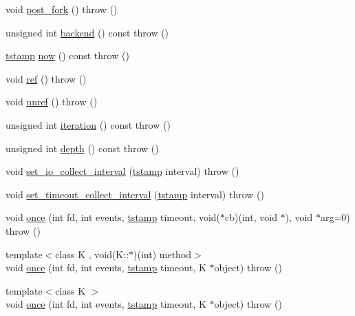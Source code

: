 \begin{DoxyCompactItemize}
\item 
void \hyperlink{structev_1_1loop__ref_a974a8c58270dc360e96f567d31a7176e}{post\-\_\-fork} ()  throw ()
\item 
unsigned int \hyperlink{structev_1_1loop__ref_ae47173b96e5b1a587c38070bfe78d98a}{backend} () const   throw ()
\item 
\hyperlink{namespaceev_a9853823b701944a8a5ce179d10a24b97}{tstamp} \hyperlink{structev_1_1loop__ref_a98d982e3931bfdd1e920dd577db61c31}{now} () const   throw ()
\item 
void \hyperlink{structev_1_1loop__ref_ae84429cc5d55e687f3abbd5c0bfe7430}{ref} ()  throw ()
\item 
void \hyperlink{structev_1_1loop__ref_abe058b11156f019666c15a53a3fa7218}{unref} ()  throw ()
\item 
unsigned int \hyperlink{structev_1_1loop__ref_a2b3d64162433abbd749e2722926fb0b5}{iteration} () const   throw ()
\item 
unsigned int \hyperlink{structev_1_1loop__ref_a38a6400670c0b7da8bf9523a22d68692}{depth} () const   throw ()
\item 
void \hyperlink{structev_1_1loop__ref_aeace41f14b7d95fa116a81298ab0d058}{set\-\_\-io\-\_\-collect\-\_\-interval} (\hyperlink{namespaceev_a9853823b701944a8a5ce179d10a24b97}{tstamp} interval)  throw ()
\item 
void \hyperlink{structev_1_1loop__ref_aa29b4b76ece69d4dea9509a2cf827a6c}{set\-\_\-timeout\-\_\-collect\-\_\-interval} (\hyperlink{namespaceev_a9853823b701944a8a5ce179d10a24b97}{tstamp} interval)  throw ()
\item 
void \hyperlink{structev_1_1loop__ref_a5cd55f27ad5ce7084be26022d3dc6628}{once} (int fd, int events, \hyperlink{namespaceev_a9853823b701944a8a5ce179d10a24b97}{tstamp} timeout, void($\ast$cb)(int, void $\ast$), void $\ast$arg=0)  throw ()
\item 
{\footnotesize template$<$class K , void(\-K\-::$\ast$)(int) method$>$ }\\void \hyperlink{structev_1_1loop__ref_aecce9953b684e4b8db13b3a9d82520ca}{once} (int fd, int events, \hyperlink{namespaceev_a9853823b701944a8a5ce179d10a24b97}{tstamp} timeout, \-K $\ast$object)  throw ()
\item 
{\footnotesize template$<$class K $>$ }\\void \hyperlink{structev_1_1loop__ref_ae3a77041d3c6ae893f0573000cac252a}{once} (int fd, int events, \hyperlink{namespaceev_a9853823b701944a8a5ce179d10a24b97}{tstamp} timeout, \-K $\ast$object)  throw ()
\item 

\end{DoxyCompactItemize}

